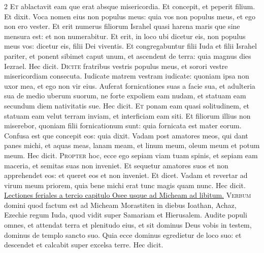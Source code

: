 \begin{multicols*}{2}
\lettrine[lines=2]{\zallmancaps \color{Red} E}{t} ablactavit eam que erat absque misericordia. Et concepit, et peperit filium. Et dixit. Voca nomen eius non populus meus: quia vos non populus meus, et ego non ero vester. Et erit numerus filiorum Israhel quasi harena maris que sine mensura est: et non numerabitur. Et erit, in loco ubi dicetur eis, non populus
meus vos: dicetur eis, filii Dei viventis. Et congregabuntur filii Iuda et filii Israhel pariter, et ponent sibimet caput unum, et ascendent de terra: quia magnus dies Iezrael. Hec dicit.
\lettrine[lines=2]{\zallmancaps \color{Blue} D}{icite} fratribus vestris populus meus, et sorori vestre misericordiam consecuta. Iudicate matrem vestram iudicate: quoniam ipsa non uxor mea, et ego non vir eius. Auferat fornicationes suas a facie sua, et adulteria sua de medio uberum suorum, ne forte expoliem eam nudam, et statuam eam secundum diem nativitatis sue. Hec dicit.
\lettrine[lines=2]{\zallmancaps \color{Red} E}{t} ponam eam quasi solitudinem, et statuam eam velut terram inviam, et interficiam eam siti. Et filiorum illius non miserebor, quoniam filii fornicationum sunt: quia fornicata est mater eorum. Confusa est que concepit eos: quia dixit. Vadam post amatores meos, qui dant panes michi, et aquas meas, lanam meam, et linum meum, oleum meum et potum meum. Hec dicit.
\lettrine[lines=2]{\zallmancaps \color{Blue} P}{ropter} hoc, ecce ego sepiam viam tuam spinis, et sepiam eam maceria, et semitas suas non inveniet. Et sequetur amatores suos et non apprehendet eos: et queret eos et non inveniet. Et dicet. Vadam et revertar ad virum meum priorem, quia bene michi erat tunc magis quam nunc. Hec dicit.
\newline \ul{Lectiones feriales a tercio capitulo Osee usque ad Micheam ad libitum.}
{\color{Red} }
\lettrine[lines=2]{\zallmancaps \color{Red} V}{erbum} domini quod factum est ad Micheam Morastiten in diebus Ioathan, Achaz, Ezechie regum Iuda, quod vidit super Samariam et Hierusalem. Audite populi omnes, et attendat terra et plenitudo eius, et sit dominus Deus vobis in testem, dominus de templo sancto suo. Quia ecce dominus egredietur de loco suo: et descendet et calcabit super excelsa terre. Hec dicit.

\end{multicols*}
